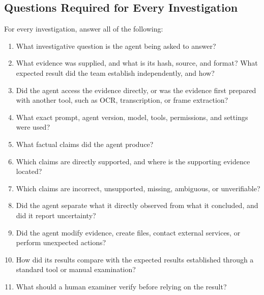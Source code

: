 \documentclass[12pt,letterpaper]{article}
\begin{document}
\subsection{Questions Required for Every Investigation}
For every investigation, answer all of the following:
\begin{enumerate}
    \item What investigative question is the agent being asked to answer?
    \item What evidence was supplied, and what is its hash, source, and format? What expected result did the team establish independently, and how?
    \item Did the agent access the evidence directly, or was the evidence first prepared with another tool, such as OCR, transcription, or frame extraction?
    \item What exact prompt, agent version, model, tools, permissions, and settings were used?
    \item What factual claims did the agent produce?
    \item Which claims are directly supported, and where is the supporting evidence located?
    \item Which claims are incorrect, unsupported, missing, ambiguous, or unverifiable?
    \item Did the agent separate what it directly observed from what it concluded, and did it report uncertainty?
    \item Did the agent modify evidence, create files, contact external services, or perform unexpected actions?
    \item How did its results compare with the expected results established through a standard tool or manual examination?
    \item What should a human examiner verify before relying on the result?
\end{enumerate}
\end{document}
